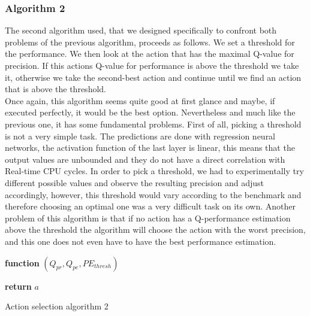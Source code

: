 \subsubsection{Algorithm 2}
The second algorithm used, that we designed specifically to confront both problems of the previous algorithm, proceeds as follows. We set a threshold for the performance. We then look at the action that has the maximal Q-value for precision. If this actions Q-value for performance is above the threshold we take it, otherwise we take the second-best action and continue until we find an action that is above the threshold.\\
Once again, this algorithm seems quite good at first glance and maybe, if executed perfectly, it would be the best option. Nevertheless and much like the previous one, it has some fundamental problems. First of all, picking a threshold is not a very simple task. The predictions are done with regression neural networks, the activation function of the last layer is linear, this means that the output values are unbounded and they do not have a direct correlation with Real-time CPU cycles. In order to pick a threshold, we had to experimentally try different possible values and observe the resulting precision and adjust accordingly, however, this threshold would vary according to the benchmark and therefore choosing an optimal one was a very difficult task on its own. Another problem of this algorithm is that if no action has a Q-performance estimation above the threshold the algorithm will choose the action with the worst precision, and this one does not even have to have the best performance estimation. 
\begin{center}
	\begin{algorithm}[H]

    \textbf{function}  $(Q_{pr},Q_{pe},PE_{thresh})$\;
    
    
    \Indp{}\Indm
    \Indp{} \Indm
    \Indp
    
   
  
   \textbf{return} $a$
   
    
\caption{Action selection algorithm 2}
\end{algorithm}
\end{center}
